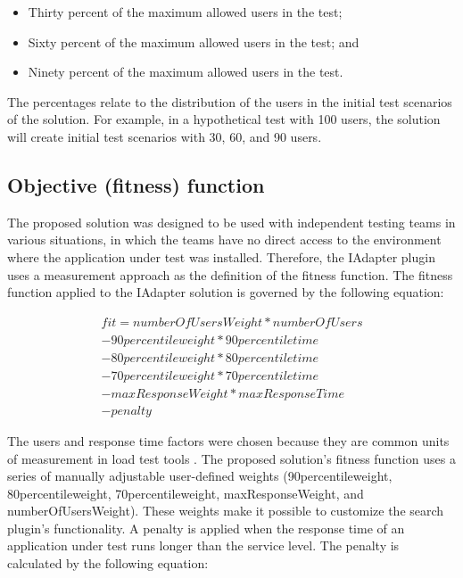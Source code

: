 \documentclass{bmcart}
\begin{document}
\begin{itemize}
\item Thirty percent of the maximum allowed users in the test;
\item Sixty percent of the maximum allowed users in the test; and
\item Ninety percent of the maximum allowed users in the test.
\end{itemize}

The percentages relate to the distribution of the users in the initial test scenarios of the solution. For example, in a hypothetical test with 100 users, the solution will create initial test scenarios with 30, 60, and 90 users.

\subsection{Objective (fitness) function}

The proposed solution was designed to be used with independent testing teams in various situations, in which the teams have no direct access to the environment where the application under test was installed. Therefore, the IAdapter plugin uses a measurement approach as the definition of the fitness function. The fitness function applied to the IAdapter solution is governed by the following equation:

\begin{equation}
\begin{aligned}
fit=numberOfUsersWeight*numberOfUsers\\
-90percentileweight* 90percentiletime\\
-80percentileweight*80percentiletime\\
-70percentileweight*70percentiletime\\
-maxResponseWeight*maxResponseTime\\
-penalty
\end{aligned}
\end{equation}

The users and response time factors were chosen because they are common units of measurement in load test tools \cite{Molyneaux2009}. The proposed solution's fitness function uses a series of manually adjustable user-defined weights (90percentileweight, 80percentileweight,  70percentileweight, maxResponseWeight, and numberOfUsersWeight). These weights make it possible to customize the search plugin's functionality. A penalty is applied when the response time of an application under test runs longer than the service level. The penalty is calculated by the following equation:
\end{document}
